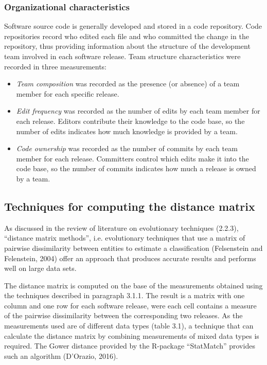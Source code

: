 \subsubsection{Organizational characteristics}
Software source code is generally developed and stored in a code repository. Code repositories record who edited each file and who committed the change in the repository, thus providing information about the structure of the development team involved in each software release. Team structure characteristics were recorded in three measurements:

\begin{itemize}
\item{\textit{Team composition} was recorded as the presence (or absence) of a team member for each specific release.}
  
\item{\textit{Edit frequency} was recorded as the number of edits by each team member for each release. Editors contribute their knowledge to the code base, so the number of edits indicates how much knowledge is provided by a team.}
  
\item{\textit{Code ownership} was recorded as the number of commits by each team member for each release. Committers control which edits make it into the code base, so the number of commits indicates how much a release is owned by a team.}
\end{itemize}

\subsection{Techniques for computing the distance matrix}
As discussed in the review of literature on evolutionary techniques (2.2.3), “distance matrix methods”, i.e. evolutionary techniques that use a matrix of pairwise dissimilarity between entities to estimate a classification (Felsenstein and Felenstein, 2004) offer an approach that produces accurate results and performs well on large data sets.

The distance matrix is computed on the base of the measurements obtained using the techniques described in paragraph 3.1.1. The result is a matrix with one column and one row for each software release, were each cell contains a measure of the pairwise dissimilarity between the corresponding two releases. As the measurements used are of different data types (table 3.1), a technique that can calculate the distance matrix by combining measurements of mixed data types is required. The Gower distance provided by the R-package “StatMatch” provides such an algorithm (D'Orazio, 2016).

